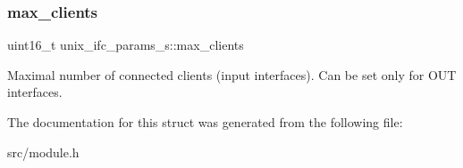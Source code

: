 \subsubsection{\texorpdfstring{max\+\_\+clients}{max\_clients}}
{\footnotesize\ttfamily uint16\+\_\+t unix\+\_\+ifc\+\_\+params\+\_\+s\+::max\+\_\+clients}

Maximal number of connected clients (input interfaces). Can be set only for O\+UT interfaces. 

The documentation for this struct was generated from the following file\+:\begin{DoxyCompactItemize}
\item 
src/module.\+h\end{DoxyCompactItemize}
